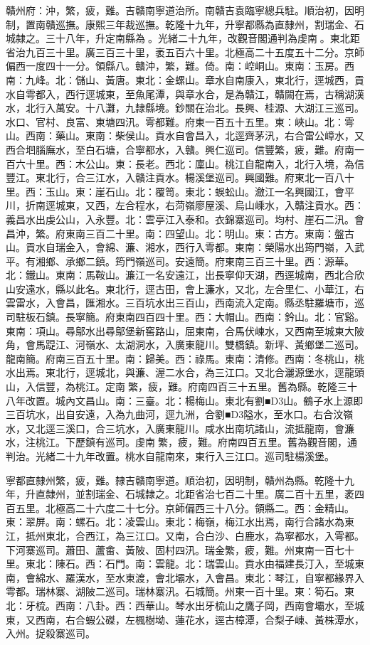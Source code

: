 \begin{pinyinscope}
贛州府：沖，繁，疲，難。吉贛南寧道治所。南贛吉袁臨寧總兵駐。順治初，因明制，置南贛巡撫。康熙三年裁巡撫。乾隆十九年，升寧都縣為直隸州，割瑞金、石城隸之。三十八年，升定南縣為。光緒二十九年，改觀音閣通判為虔南。東北距省治九百三十里。廣三百三十里，袤五百六十里。北極高二十五度五十二分。京師偏西一度四十一分。領縣八。贛沖，繁，難。倚。南：崆峒山。東南：玉房。西南：九峰。北：儲山、黃唐。東北：金螺山。章水自南康入，東北行，逕城西，貢水自雩都入，西行逕城東，至魚尾潭，與章水合，是為贛江，贛闕在焉，古稱湖漢水，北行入萬安。十八灘，九隸縣境。鈔關在治北。長興、桂源、大湖江三巡司。水口、官村、良富、東塘四汛。雩都難。府東一百五十五里。東：峽山。北：雩山。西南：藥山。東南：柴侯山。貢水自會昌入，北逕齊茅汛，右合雷公嶂水，又西合垇腦廡水，至白石塘，合寧都水，入贛。興仁巡司。信豐繁，疲，難。府南一百六十里。西：木公山。東：長老。西北：廩山。桃江自龍南入，北行入境，為信豐江。東北行，合三江水，入贛注貢水。楊溪堡巡司。興國難。府東北一百八十里。西：玉山。東：崖石山。北：覆笥。東北：蜈蚣山。瀲江一名興國江，會平川，折南逕城東，又西，左合程水，右菏嶺廖屋溪、烏山嵊水，入贛注貢水。西：義昌水出虔公山，入永豐。北：雲亭江入泰和。衣錦寨巡司。均村、崖石二汛。會昌沖，繁。府東南三百二十里。南：四望山。北：明山。東：古方。東南：盤古山。貢水自瑞金入，會綿、濂、湘水，西行入雩都。東南：榮陽水出筠門嶺，入武平。有湘鄉、承鄉二鎮。筠門嶺巡司。安遠簡。府東南三百三十里。西：源華。北：鐵山。東南：馬鞍山。濂江一名安遠江，出長寧仰天湖，西逕城南，西北合欣山安遠水，縣以此名。東北行，逕古田，會上濂水，又北，左合里仁、小華江，右雲雷水，入會昌，匯湘水。三百坑水出三百山，西南流入定南。縣丞駐羅塘市，巡司駐板石鎮。長寧簡。府東南四百四十里。西：大帽山。西南：鈐山。北：官谿。東南：項山。尋鄔水出尋鄔堡新窖路山，屈東南，合馬伏崠水，又西南至城東大陂角，會馬踶江、河嶺水、太湖洞水，入廣東龍川。雙橋鎮。新坪、黃鄉堡二巡司。龍南簡。府南三百五十里。南：歸美。西：祿馬。東南：清修。西南：冬桃山，桃水出焉。東北行，逕城北，與濂、渥二水合，為三江口。又北合灑源堡水，逕龍頭山，入信豐，為桃江。定南繁，疲，難。府南四百三十五里。舊為縣。乾隆三十八年改置。城內文昌山。南：三臺。北：楊梅山。東北有劉■D3山。鶴子水上源即三百坑水，出自安遠，入為九曲河，逕九洲，合劉■D3隘水，至水口。右合汶嶺水，又北逕三溪口，合三坑水，入廣東龍川。咸水出南坑諸山，流抵龍南，會濂水，注桃江。下歷鎮有巡司。虔南繁，疲，難。府南四百五里。舊為觀音閣，通判治。光緒二十九年改置。桃水自龍南來，東行入三江口。巡司駐楊溪堡。

寧都直隸州繁，疲，難。隸吉贛南寧道。順治初，因明制，贛州為縣。乾隆十九年，升直隸州，並割瑞金、石城隸之。北距省治七百二十里。廣二百十五里，袤四百五里。北極高二十六度二十七分。京師偏西三十八分。領縣二。西：金精山。東：翠屏。南：螺石。北：凌雲山。東北：梅嶺，梅江水出焉，南行合諸水為東江，抵州東北，合西江，為三江口。又南，合白沙、白鹿水，為寧都水，入雩都。下河寨巡司。蕭田、蘆畬、黃陂、固村四汛。瑞金繁，疲，難。州東南一百七十里。東北：陳石。西：石門。南：雲龍。北：瑞雲山。貢水由福建長汀入，至城東南，會綿水、羅漢水，至水東渡，會北壩水，入會昌。東北：琴江，自寧都緣界入雩都。瑞林寨、湖陂二巡司。瑞林寨汛。石城簡。州東一百十里。東：筍石。東北：牙梳。西南：八卦。西：西華山。琴水出牙梳山之鷹子岡，西南會壩水，至城東，又西南，右合蝦公磔，左楓樹坳、蓮花水，逕古樟潭，合梨子崠、黃株潭水，入州。捉殺寨巡司。


\end{pinyinscope}
